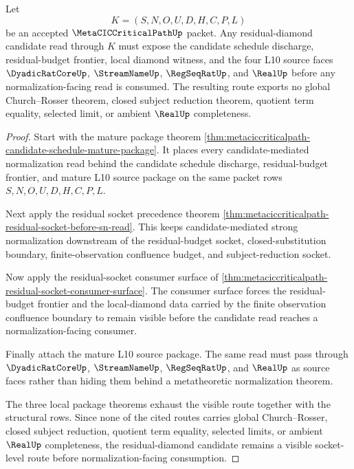 \begin{theorem}
\label{thm:metaciccriticalpath-residual-diamond-visible-route}
Let
$$
K=(S,N,O,U,D,H,C,P,L)
$$
be an accepted $\MetaCICCriticalPathUp$ packet. Any residual-diamond candidate read through $K$ must expose the candidate schedule discharge, residual-budget frontier, local diamond witness, and the four L10 source faces $\DyadicRatCoreUp$, $\StreamNameUp$, $\RegSeqRatUp$, and $\RealUp$ before any normalization-facing read is consumed. The resulting route exports no global Church--Rosser theorem, closed subject reduction theorem, quotient term equality, selected limit, or ambient $\RealUp$ completeness.
\end{theorem}
\begin{proof}
Start with the mature package theorem \autoref{thm:metaciccriticalpath-candidate-schedule-mature-package}. It places every candidate-mediated normalization read behind the candidate schedule discharge, residual-budget frontier, and mature L10 source package on the same packet rows $S,N,O,U,D,H,C,P,L$.

Next apply the residual socket precedence theorem \autoref{thm:metaciccriticalpath-residual-socket-before-sn-read}. This keeps candidate-mediated strong normalization downstream of the residual-budget socket, closed-substitution boundary, finite-observation confluence budget, and subject-reduction socket.

Now apply the residual-socket consumer surface of \autoref{thm:metaciccriticalpath-residual-socket-consumer-surface}. The consumer surface forces the residual-budget frontier and the local-diamond data carried by the finite observation confluence boundary to remain visible before the candidate read reaches a normalization-facing consumer.

Finally attach the mature L10 source package. The same read must pass through $\DyadicRatCoreUp$, $\StreamNameUp$, $\RegSeqRatUp$, and $\RealUp$ as source faces rather than hiding them behind a metatheoretic normalization theorem.

The three local package theorems exhaust the visible route together with the structural rows. Since none of the cited routes carries global Church--Rosser, closed subject reduction, quotient term equality, selected limits, or ambient $\RealUp$ completeness, the residual-diamond candidate remains a visible socket-level route before normalization-facing consumption.
\end{proof}

